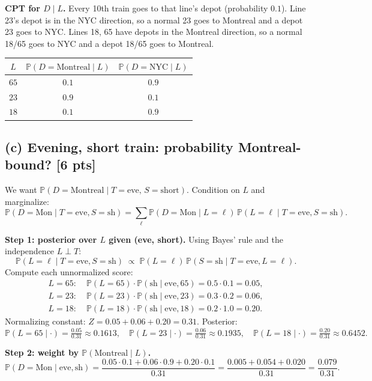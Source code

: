 \documentclass[12pt]{article}
\newcommand{\Prb}{\mathbb{P}}
\begin{document}
\textbf{CPT for $D\mid L$.} Every 10th train goes to that line's depot (probability $0.1$). Line 23's depot is in the NYC direction, so a normal 23 goes to Montreal and a depot 23 goes to NYC. Lines 18, 65 have depots in the Montreal direction, so a normal 18/65 goes to NYC and a depot 18/65 goes to Montreal.
\begin{center}
\begin{tabular}{ccc}
\toprule
$L$ & $\Prb(D=\text{Montreal}\mid L)$ & $\Prb(D=\text{NYC}\mid L)$ \\
\midrule
$65$ & $0.1$ & $0.9$ \\
$23$ & $0.9$ & $0.1$ \\
$18$ & $0.1$ & $0.9$ \\
\bottomrule
\end{tabular}
\end{center}

\subsection*{(c) Evening, short train: probability Montreal-bound? [6 pts]}

We want $\Prb(D=\text{Montreal}\mid T=\text{eve},\,S=\text{short})$. Condition on $L$ and marginalize:
\[
  \Prb(D=\text{Mon}\mid T=\text{eve},S=\text{sh})
  = \sum_{\ell}\Prb(D=\text{Mon}\mid L=\ell)\,\Prb(L=\ell\mid T=\text{eve},S=\text{sh}).
\]

\textbf{Step 1: posterior over $L$ given (eve, short).} Using Bayes' rule and the independence $L\perp T$:
\[
  \Prb(L=\ell\mid T=\text{eve},S=\text{sh}) \;\propto\; \Prb(L=\ell)\,\Prb(S=\text{sh}\mid T=\text{eve},L=\ell).
\]
Compute each unnormalized score:
\begin{align*}
  L=65:\;&\Prb(L=65)\cdot\Prb(\text{sh}\mid \text{eve},65) = 0.5\cdot 0.1 = 0.05,\\
  L=23:\;&\Prb(L=23)\cdot\Prb(\text{sh}\mid \text{eve},23) = 0.3\cdot 0.2 = 0.06,\\
  L=18:\;&\Prb(L=18)\cdot\Prb(\text{sh}\mid \text{eve},18) = 0.2\cdot 1.0 = 0.20.
\end{align*}
Normalizing constant: $Z = 0.05+0.06+0.20 = 0.31$. Posterior:
\[
  \Prb(L=65\mid \cdot)=\tfrac{0.05}{0.31}\approx 0.1613,\quad
  \Prb(L=23\mid \cdot)=\tfrac{0.06}{0.31}\approx 0.1935,\quad
  \Prb(L=18\mid \cdot)=\tfrac{0.20}{0.31}\approx 0.6452.
\]

\textbf{Step 2: weight by $\Prb(\text{Montreal}\mid L)$.}
\[
  \Prb(D=\text{Mon}\mid \text{eve},\text{sh})
  = \frac{0.05\cdot 0.1 + 0.06\cdot 0.9 + 0.20\cdot 0.1}{0.31}
  = \frac{0.005 + 0.054 + 0.020}{0.31}
  = \frac{0.079}{0.31}.
\]
\end{document}
